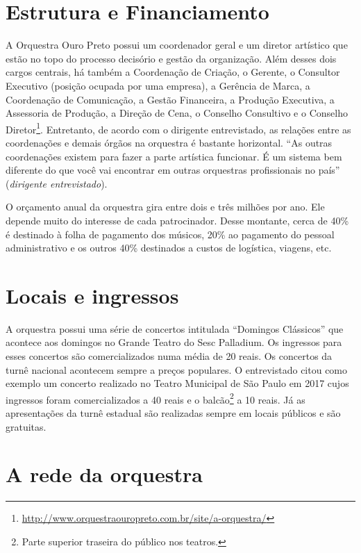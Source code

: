 \documentclass[a4paper, 12pt, openright, oneside, german, french, english, brazil]{abntex2}
\begin{document}
	\section{Estrutura e Financiamento}
	
	A Orquestra Ouro Preto possui um coordenador geral e um diretor artístico que estão no topo do processo decisório e gestão da organização. Além desses dois cargos centrais, há também a Coordenação de Criação, o Gerente, o Consultor Executivo (posição ocupada por uma empresa), a Gerência de Marca, a Coordenação de Comunicação, a Gestão Financeira, a Produção Executiva, a Assessoria de Produção, a Direção de Cena, o Conselho Consultivo e o Conselho Diretor\footnote{\url{http://www.orquestraouropreto.com.br/site/a-orquestra/}}. Entretanto, de acordo com o dirigente entrevistado, as relações entre as coordenações e demais órgãos na orquestra é bastante horizontal. ``As outras coordenações existem para fazer a parte artística funcionar. É um sistema bem diferente do que você vai encontrar em outras orquestras profissionais no país'' (\textit{dirigente entrevistado}). 
	
	O orçamento anual da orquestra gira entre dois e três milhões por ano. Ele depende muito do interesse de cada patrocinador. Desse montante, cerca de 40\% é destinado à folha de pagamento dos músicos, 20\% ao pagamento do pessoal administrativo e os outros 40\% destinados a custos de logística, viagens, etc.
	
	\section{Locais e ingressos}
	
	A orquestra possui uma série de concertos intitulada ``Domingos Clássicos'' que acontece aos domingos no Grande Teatro do Sesc Palladium. Os ingressos para esses concertos são comercializados numa média de 20 reais. Os concertos da turnê nacional acontecem sempre a preços populares. O entrevistado citou como exemplo um concerto realizado no Teatro Municipal de São Paulo em 2017 cujos ingressos foram comercializados a 40 reais e o balcão\footnote{Parte superior traseira do público nos teatros.} a 10 reais. Já as apresentações da turnê estadual são realizadas sempre em locais públicos e são gratuitas.
	
	\section{A rede da orquestra}
	
\end{document}
